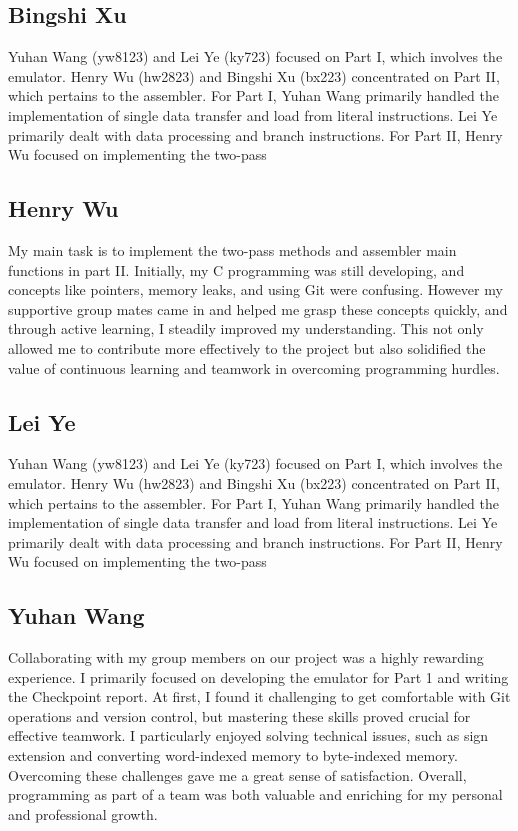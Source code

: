 \documentclass[11pt]{article}
\begin{document}
\subsection{Bingshi Xu}

Yuhan Wang (yw8123) and Lei Ye (ky723) focused on Part I, which involves the emulator. Henry Wu (hw2823) and Bingshi Xu (bx223) concentrated on Part II, which pertains to the assembler.
For Part I, Yuhan Wang primarily handled the implementation of single data transfer and load from literal instructions. Lei Ye primarily dealt with data processing and branch instructions.
For Part II, Henry Wu focused on implementing the two-pass 

\subsection{Henry Wu}

My main task is to implement the two-pass methods and assembler main functions in part II. 
Initially, my C programming was still developing, and concepts like pointers, memory leaks, 
and using Git were confusing. However my supportive group mates came in and helped me grasp 
these concepts quickly, and through active learning, I steadily improved my understanding. 
This not only allowed me to contribute more effectively to the project but also 
solidified the value of continuous learning and teamwork in overcoming programming hurdles.

\subsection{Lei Ye}

Yuhan Wang (yw8123) and Lei Ye (ky723) focused on Part I, which involves the emulator. Henry Wu (hw2823) and Bingshi Xu (bx223) concentrated on Part II, which pertains to the assembler.
For Part I, Yuhan Wang primarily handled the implementation of single data transfer and load from literal instructions. Lei Ye primarily dealt with data processing and branch instructions.
For Part II, Henry Wu focused on implementing the two-pass 

\subsection{Yuhan Wang}
Collaborating with my group members on our project was a highly rewarding 
experience. I primarily focused on developing the emulator for Part 1 and 
writing the Checkpoint report. At first, I found it challenging to get 
comfortable with Git operations and version control, but mastering these 
skills proved crucial for effective teamwork. I particularly enjoyed solving 
technical issues, such as sign extension and converting word-indexed memory 
to byte-indexed memory. Overcoming these challenges gave me a great sense of 
satisfaction. Overall, programming as part of a team was both valuable and 
enriching for my personal and professional growth.
\end{document}
